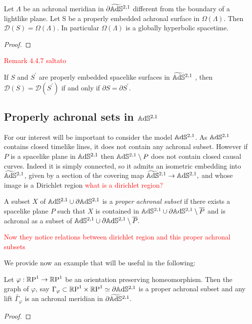\begin{proposition}
    Let $\Lambda$ be an achronal meridian in $\partial\widetilde{\mathbb{A}\mathrm{d}\mathbb{S}}{}^{2,1}$ different from the boundary of a lightlike plane. Let S be a properly embedded achronal surface in $\Omega(\Lambda)$. Then $\mathcal{D}(S)=\Omega(\Lambda)$. In particular $\Omega(\Lambda)$ is a globally hyperbolic spacetime.
\end{proposition}
\begin{proof}
    
\end{proof}


\textcolor{red}{Remark 4.4.7 saltato}

\begin{corollary}
    If $S$ and $S^{\prime}$ are properly embedded spacelike surfaces in $\widetilde{\mathbb{A}\mathrm{d}\mathbb{S}}{}^{2,1}$ , then $\mathcal{D}(S)=\mathcal{D}(S^{\prime})$ if and only if $\partial S=\partial S^{\prime}$.
\end{corollary}

\subsection{Properly achronal sets in $\mathbb{A}\mathrm{d}\mathbb{S}^{2,1}$}
For our interest will be important to consider the model $\mathbb{A}\mathrm{d}\mathbb{S}^{2,1}$. As $\mathbb{A}\mathrm{d}\mathbb{S}^{2,1}$ contains closed timelike lines, it does not contain any achronal subset. However if $P$ is a spacelike plane in $\mathbb{A}\mathrm{d}\mathbb{S}^{2,1}$ then $\mathbb{A}\mathrm{d}\mathbb{S}^{2,1}\setminus P$ does not contain closed causal curves. Indeed it is simply connected, so it admits an isometric embedding into $\widetilde{\mathbb{A}\mathrm{d}\mathbb{S}}{}^{2,1}$, given by a section of the covering map $\widetilde{\mathbb{A}\mathrm{d}\mathbb{S}}{}^{2,1}\to\mathbb{A}\mathrm{d}\mathbb{S}^{2,1},$ and whose image is a Dirichlet region \textcolor{red}{what is a dirichlet region?}

\begin{definition}
    A subset $X$ of $\mathbb{A}\mathrm{d}\mathbb{S}^{2,1}\cup\partial\mathbb{A}\mathrm{d}\mathbb{S}^{2,1}$ is a \textit{proper achronal subset} if there exists a spacelike plane $P$ such that $X$ is contained in $\mathbb{A}\mathrm{d}\mathbb{S}^{2,1}\cup\partial\mathbb{A}\mathrm{d}\mathbb{S}^{2,1}\setminus\overline{P}$ and is achronal as a subset of $\mathbb{A}\mathrm{d}\mathbb{S}^{2,1}\cup\partial\mathbb{A}\mathrm{d}\mathbb{S}^{2,1}\setminus\overline{P}.$  
\end{definition}

\textcolor{red}{Now they notice relations between dirichlet region and this proper achronal subsets}

We provide now an example that will be useful in the following:

\begin{lemma}
    Let $\varphi:\mathbb{R}\text{P}^1\to\mathbb{R}\text{P}^1$ be an orientation preserving homeomorphism. Then the graph of $\varphi$, say $\Gamma_\varphi\subset \mathbb{R}\text{P}^1\times\mathbb{R}\text{P}^1\simeq\partial\mathbb{A}\mathrm{d}\mathbb{S}^{2,1}$ is a proper achronal subset and any lift $\tilde{\Gamma_\varphi}$ is an achronal meridian in $\partial\widetilde{\mathbb{A}\mathrm{d}\mathbb{S}}{}^{2,1}.$  
\end{lemma}
\begin{proof}
\end{proof}

